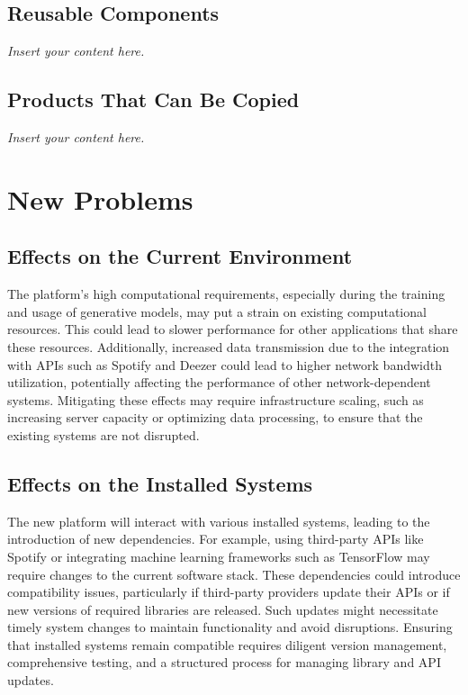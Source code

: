 \documentclass[12pt]{article}
\newcommand{\lips}{\textit{Insert your content here.}}
\begin{document}
\subsection{Reusable Components}
\lips
\subsection{Products That Can Be Copied}
\lips

\section{New Problems}

\subsection{Effects on the Current Environment}

The platform's high computational requirements, especially during the training and usage of generative models, may put a strain on existing computational resources. This could lead to slower performance for other applications that share these resources. Additionally, increased data transmission due to the integration with APIs such as Spotify and Deezer could lead to higher network bandwidth utilization, potentially affecting the performance of other network-dependent systems. Mitigating these effects may require infrastructure scaling, such as increasing server capacity or optimizing data processing, to ensure that the existing systems are not disrupted.

\subsection{Effects on the Installed Systems}

The new platform will interact with various installed systems, leading to the introduction of new dependencies. For example, using third-party APIs like Spotify or integrating machine learning frameworks such as TensorFlow may require changes to the current software stack. These dependencies could introduce compatibility issues, particularly if third-party providers update their APIs or if new versions of required libraries are released. Such updates might necessitate timely system changes to maintain functionality and avoid disruptions. Ensuring that installed systems remain compatible requires diligent version management, comprehensive testing, and a structured process for managing library and API updates.
\end{document}
